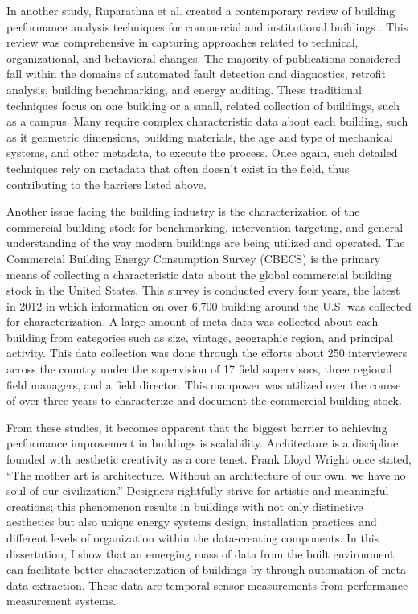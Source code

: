 In another study, Ruparathna et al. created a contemporary review of building performance analysis techniques for commercial and institutional buildings \citep{ruparathna_improving_2016}. This review was comprehensive in capturing approaches related to technical, organizational, and behavioral changes. The majority of publications considered fall within the domains of automated fault detection and diagnostics, retrofit analysis, building benchmarking, and energy auditing. These traditional techniques focus on one building or a small, related collection of buildings, such as a campus. Many require complex characteristic data about each building, such as it geometric dimensions, building materials, the age and type of mechanical systems, and other metadata, to execute the process. Once again, such detailed techniques rely on metadata that often doesn't exist in the field, thus contributing to the barriers listed above.

Another issue facing the building industry is the characterization of the commercial building stock for benchmarking, intervention targeting, and general understanding of the way modern buildings are being utilized and operated. The Commercial Building Energy Consumption Survey (CBECS) is the primary means of collecting a characteristic data about the global commercial building stock in the United States. This survey is conducted every four years, the latest in 2012 in which information on over 6,700 building around the U.S. was collected for characterization. A large amount of meta-data was collected about each building from categories such as size, vintage, geographic region, and principal activity. This data collection was done through the efforts about 250 interviewers across the country under the supervision of 17 field supervisors, three regional field managers, and a field director. This manpower was utilized over the course of over three years to characterize and document the commercial building stock.


From these studies, it becomes apparent that the biggest barrier to achieving performance improvement in buildings is scalability. Architecture is a discipline founded with aesthetic creativity as a core tenet. Frank Lloyd Wright once stated, ``The mother art is architecture. Without an architecture of our own, we have no soul of our civilization.'' Designers rightfully strive for artistic and meaningful creations; this phenomenon results in buildings with not only distinctive aesthetics but also unique energy systems design, installation practices and different levels of organization within the data-creating components. In this dissertation, I show that an emerging mass of data from the built environment can facilitate better characterization of buildings by through automation of meta-data extraction. These data are temporal sensor measurements from performance measurement systems.

